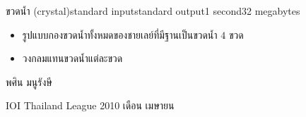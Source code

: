 \documentclass[11pt,a4paper]{article}
\begin{document}
\begin{problem}{ขวดน้ำ (crystal)}{standard input}{standard output}{1 second}{32 megabytes}
\begin{itemize}

\item รูปแบบกองขวดน้ำทั้งหมดของชายเลย์ที่มีฐานเป็นขวดน้ำ $4$ ขวด
\item วงกลมแทนขวดน้ำแต่ละขวด
\end{itemize}

\Source

พศิน มนูรังษี

IOI Thailand League 2010 เดือน เมษายน

\end{problem}
\end{document}
